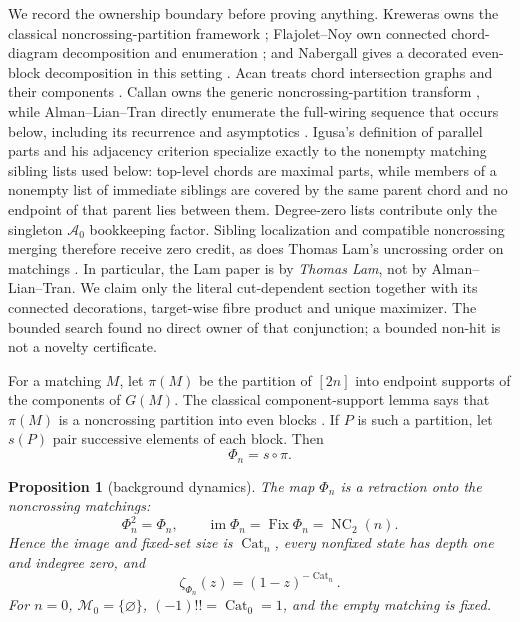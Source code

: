 \documentclass[10pt,a4paper]{amsart}
\newtheorem{proposition}[theorem]{Proposition}
\theoremstyle{definition}
\theoremstyle{remark}
\newcommand{\M}{\mathcal M}
\newcommand{\NC}{\operatorname{NC}}
\newcommand{\Fix}{\operatorname{Fix}}
\newcommand{\im}{\operatorname{im}}
\newcommand{\Cat}{\operatorname{Cat}}
\begin{document}
We record the ownership boundary before proving anything.  Kreweras owns the
classical noncrossing-partition framework \cite{Kreweras1972};
Flajolet--Noy own connected chord-diagram decomposition and enumeration
\cite{FlajoletNoy2000}; and Nabergall gives a decorated even-block
decomposition in this setting \cite{Nabergall2022}.  Acan treats chord
intersection graphs and their components \cite{Acan2017}.  Callan owns the
generic noncrossing-partition transform \cite{Callan2008}, while
Alman--Lian--Tran directly enumerate the full-wiring sequence that occurs
below, including its recurrence and asymptotics
\cite{AlmanLianTran2015}.  Igusa's definition of parallel parts and his
adjacency criterion \cite[Definition~1.7 and Proposition~1.8]{Igusa2025}
specialize exactly to the nonempty matching sibling lists used below:
top-level chords are maximal parts, while members of a nonempty list of
immediate siblings are covered by the same parent chord and no endpoint of
that parent lies between them.  Degree-zero lists contribute only the singleton
$\mathcal A_0$ bookkeeping factor.  Sibling localization and compatible
noncrossing merging therefore receive zero credit, as does Thomas Lam's
uncrossing order on matchings \cite{Lam2015}.
In particular, the Lam paper is by \emph{Thomas Lam}, not by
Alman--Lian--Tran.  We claim only the literal cut-dependent section together
with its connected decorations, target-wise fibre product and unique
maximizer.  The bounded search found no direct owner of that conjunction; a
bounded non-hit is not a novelty certificate.

For a matching $M$, let $\pi(M)$ be the partition of $[2n]$ into endpoint
supports of the components of $G(M)$.  The classical component-support lemma
says that $\pi(M)$ is a noncrossing partition into even blocks
\cite{FlajoletNoy2000,Nabergall2022}.  If $P$ is such a partition, let $s(P)$
pair successive elements of each block.  Then
\begin{equation}
                         \Phi_n=s\circ\pi.              \label{eq:factor}
\end{equation}

\begin{proposition}[background dynamics]\label{prop:retraction}
The map $\Phi_n$ is a retraction onto the noncrossing matchings:
\[
 \Phi_n^2=\Phi_n,
 \qquad \im\Phi_n=\Fix\Phi_n=\NC_2(n).
\]
Hence the image and fixed-set size is $\Cat_n$, every nonfixed state has
depth one and indegree zero, and
\[
 \zeta_{\Phi_n}(z)=(1-z)^{-\Cat_n}.
\]
For $n=0$, $\M_0=\{\varnothing\}$, $(-1)!!=\Cat_0=1$, and the empty
matching is fixed.
\end{proposition}
\end{document}
